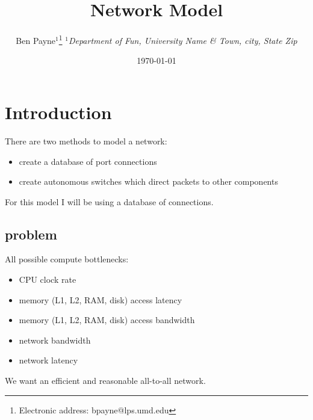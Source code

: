 \documentclass[pdftex]{article}
\begin{document}
\title{Network Model}

\author{Ben Payne$^{1}$\footnote{Electronic address: bpayne@lps.umd.edu}
{\it $^{1}$Department of Fun, University Name \& Town, city, State Zip}}

\date{\today}



\tableofcontents


\section{Introduction}

There are two methods to model a network:
\begin{itemize}
 \item create a database of port connections
 \item create autonomous switches which direct packets to other components
\end{itemize}
For this model I will be using a database of connections.

\subsection{problem}

All possible compute bottlenecks:
\begin{itemize}
 \item CPU clock rate
 \item memory (L1, L2, RAM, disk) access latency
 \item memory (L1, L2, RAM, disk) access bandwidth
 \item network bandwidth
 \item network latency
\end{itemize}

We want an efficient and reasonable all-to-all network. 
\end{document}
